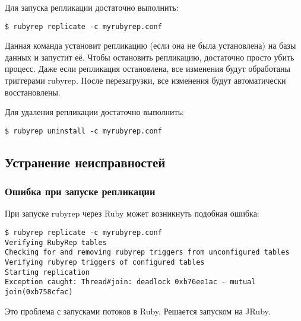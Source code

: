 Для запуска репликации достаточно выполнить:

\begin{lstlisting}[label=lst:rubyrep10,caption=Репликация]
$ rubyrep replicate -c myrubyrep.conf
\end{lstlisting}

Данная команда установит репликацию (если она не была установлена) на базы данных и запустит её. Чтобы остановить репликацию, достаточно просто убить процесс. Даже если репликация остановлена, все изменения будут обработаны триггерами rubyrep. После перезагрузки, все изменения будут автоматически восстановлены.

Для удаления репликации достаточно выполнить:

\begin{lstlisting}[label=lst:rubyrep11,caption=Репликация]
$ rubyrep uninstall -c myrubyrep.conf
\end{lstlisting}

\subsection{Устранение неисправностей}

\subsubsection{Ошибка при запуске репликации}

При запуске rubyrep через Ruby может возникнуть подобная ошибка:

\begin{lstlisting}[label=lst:rubyrep12,caption=Устранение неисправностей]
$ rubyrep replicate -c myrubyrep.conf
Verifying RubyRep tables
Checking for and removing rubyrep triggers from unconfigured tables
Verifying rubyrep triggers of configured tables
Starting replication
Exception caught: Thread#join: deadlock 0xb76ee1ac - mutual join(0xb758cfac)
\end{lstlisting}

Это проблема с запусками потоков в Ruby. Решается запуском на JRuby.
